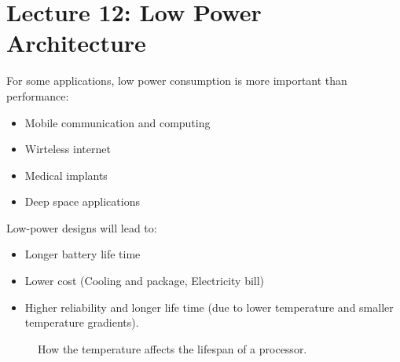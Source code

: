 \section{Lecture 12: Low Power Architecture}
For some applications, low power consumption is more important than performance:
\begin{itemize}
\item Mobile communication and computing
\item Wirteless internet
\item Medical implants
\item Deep space applications 
\end{itemize}

Low-power designs will lead to:
\begin{itemize}
\item Longer battery life time
\item Lower cost (Cooling and package, Electricity bill)
\item Higher reliability and longer life time (due to lower temperature and smaller temperature gradients).
  \newline
\end{itemize}

\begin{figure}[H]
  \centering
  \caption{How the temperature affects the lifespan of a processor.}
  \label{fig:thermal-reliability}
\end{figure}

